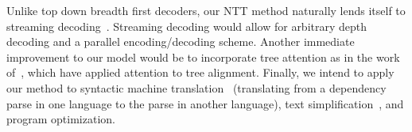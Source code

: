 \documentclass{article}
\begin{document}
Unlike top down breadth first decoders, our NTT method naturally lends itself to streaming decoding~\citep{alur2012streaming}. Streaming decoding would allow for arbitrary depth decoding and a parallel encoding/decoding scheme. Another immediate improvement to our model would be to incorporate tree attention as in the work of~\citet{munkhdalai2016neural}, which have applied attention to tree alignment. Finally, we intend to apply our method to syntactic machine translation~\citep{cowan2008tree} (translating from a dependency parse in one language to the parse in another language), text simplification~\citep{find paper again}, and program optimization.


\small


\end{document}
